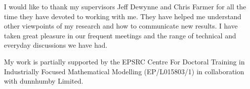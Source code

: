 \documentclass[main.tex]{subfiles}
\begin{document}
I would like to thank my supervisors Jeff Dewynne and Chris Farmer for
all the time they have devoted to working with me. They have helped me
understand other viewpoints of my research and how to communicate new
results. I have taken great pleasure in our frequent meetings and the
range of technical and everyday discussions we have had.

My work is partially supported by the EPSRC Centre For Doctoral
Training in Industrially Focused Mathematical Modelling (EP/L015803/1)
in collaboration with dunnhumby Limited.
\end{document}
